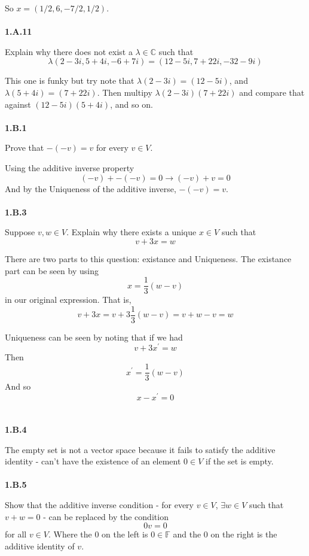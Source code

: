So $x = (1/2, 6, -7/2, 1/2)$.
\\~\\



\textbf{1.A.11}

Explain why there does not exist a $\lambda \in \mathbb{C}$ such that
$$
\lambda \left( 2-3i, 5+4i, -6+7i \right) = \left( 12-5i, 7+22i, -32-9i \right)
$$

This one is funky but try note that $\lambda(2-3i) = (12-5i)$, and $\lambda(5+4i) = (7+22i)$.
Then multipy $\lambda(2-3i)(7+22i)$ and compare that against $(12-5i)(5+4i)$, and so on.
\\~\\



\textbf{1.B.1}

Prove that $-(-v) = v$ for every $v\in V$.

Using the additive inverse property
$$
(-v) + -(-v) = 0 \rightarrow (-v) + v = 0
$$
And by the Uniqueness of the additive inverse, $-(-v) = v$.
\\~\\



\textbf{1.B.3}

Suppose $v, w \in V$.
Explain why there exists a unique $x\in V$ such that
$$
v + 3x = w
$$

There are two parts to this question: existance and Uniqueness.
The existance part can be seen by using
$$
x = \frac{1}{3}(w - v)
$$
in our original expression.
That is,
$$
v + 3x = v + 3 \frac{1}{3}(w - v) = v + w - v = w
$$

Uniqueness can be seen by noting that if we had
$$
v + 3x^{\prime} = w
$$
Then
$$
x^{\prime} = \frac{1}{3}(w - v)
$$
And so
$$
x - x^{\prime} = 0 
$$
\\~\\


\textbf{1.B.4}

The empty set is not a vector space because it fails to satisfy the additive identity -
can't have the existence of an element $0\in V$ if the set is empty.
\\~\\


\textbf{1.B.5}

Show that the additive inverse condition - for every $v\in V$, $\exists w\in V$ such that $v+w = 0$ -
can be replaced by the condition
$$
0v = 0
$$
for all $v\in V$.
Where the $0$ on the left is $0\in\mathbb{F}$ and the $0$ on the right is the additive identity of
$v$.
\\

